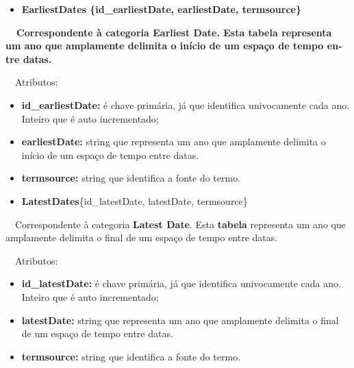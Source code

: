 \documentclass[letterpaper]{article}
\newcommand\textstyleStrongEmphasis[1]{\textbf{#1}}
\newcommand\liststyleLi{%
\renewcommand\labelitemi{{\textbullet}}
\renewcommand\labelitemii{[27A2?]}
\renewcommand\labelitemiii{{\textbullet}}
\renewcommand\labelitemiv{{\textbullet}}
}
\newcommand\liststyleLxii{%
\renewcommand\labelitemi{[27A2?]}
\renewcommand\labelitemii{[27A2?]}
\renewcommand\labelitemiii{[27A2?]}
\renewcommand\labelitemiv{[27A2?]}
}
\begin{document}
\bigskip

\liststyleLi
\begin{itemize}
\item {\bfseries
EarliestDates\textmd{ \{}\textmd{id\_earliestDate}\textmd{,
earliestDate, termsource\}}}
\end{itemize}
{\bfseries
\foreignlanguage{english}{\textmd{\ \ Correspondente \`a categoria
}}\foreignlanguage{english}{Earliest}\textstyleStrongEmphasis{\foreignlanguage{english}{
Date}}\foreignlanguage{english}{\textmd{. Esta
}}\textstyleStrongEmphasis{\foreignlanguage{english}{\textmd{tabela}}}\foreignlanguage{english}{\textmd{
representa um ano que amplamente delimita o in\'icio de um espa\c{c}o
de tempo entre datas.}}}


\bigskip

{
\ \ Atributos:}

\liststyleLxii
\begin{itemize}
\item {
\textbf{id\_earliestDate: }\'e chave prim\'aria, j\'a que identifica
univocamente cada ano. Inteiro que \'e auto incrementado;}
\item {
\textbf{earliestDate:} string que representa um ano que amplamente
delimita o in\'icio de um espa\c{c}o de tempo entre datas.}
\item {
\textbf{termsource:} string que identifica a fonte do termo.}
\end{itemize}

\bigskip

\liststyleLi
\begin{itemize}
\item {
\textbf{LatestDates}\{id\_latestDate, latestDate, termsource\}}
\end{itemize}
{
\foreignlanguage{english}{\ \ Correspondente \`a categoria
}\textstyleStrongEmphasis{\foreignlanguage{english}{Latest
Date}}\foreignlanguage{english}{. Esta
}\textstyleStrongEmphasis{\foreignlanguage{english}{\textmd{tabela}}}\foreignlanguage{english}{
representa um ano que amplamente delimita o final de um espa\c{c}o de
tempo entre datas.}}


\bigskip

{
\ \ Atributos:}

\liststyleLxii
\begin{itemize}
\item {
\textbf{id\_latestDate: }\'e chave prim\'aria, j\'a que identifica
univocamente cada ano. Inteiro que \'e auto incrementado;}
\item {
\textbf{latestDate:} string que representa um ano que amplamente
delimita o final de um espa\c{c}o de tempo entre datas.}
\item {
\textbf{termsource:} string que identifica a fonte do termo.}
\end{itemize}
\end{document}

